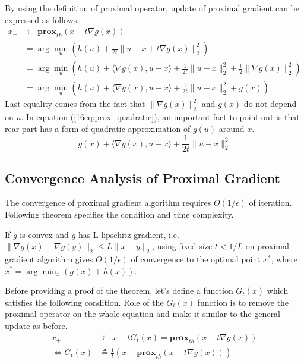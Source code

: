 \documentclass[12pt]{report}
\begin{document}
By using the definition of proximal operator, update of proximal gradient can be expressed as follows:
\begin{align}
x_+ &\leftarrow \textbf{prox}_{th} \left(x - t\nabla g(x) \right)\nonumber\\
&= \arg\min_u \left( h(u)+\frac{1}{2t}\|u-x+t\nabla g(x)\|_2^2 \right)\nonumber\\
&= \arg\min_u \left( h(u)+\langle \nabla g(x), u-x \rangle + \frac{1}{2t}\|u-x\|_2^2 +\frac{t}{2}\| \nabla g(x) \|_2^2 \right)\nonumber\\
&= \arg\min_u \left( h(u)+\langle \nabla g(x), u-x \rangle + \frac{1}{2t}\|u-x\|_2^2 + g(x) \right)
\end{align}\label{16eq:prox_quadratic}
Last equality comes from the fact that $\| \nabla g(x) \|_2^2$ and $g(x)$ do not depend on $u$. In equation (\ref{16eq:prox_quadratic}), an important fact to point out is that rear part has a form of quadratic approximation of $g(u)$ around $x$.
\begin{equation}
g(x) + \langle \nabla g(x), u-x \rangle + \frac{1}{2t}\|u-x\|_2^2 
\end{equation} 

\subsection{Convergence Analysis of Proximal Gradient}
The convergence of proximal gradient algorithm requires $O(1/\epsilon)$ of iteration. Following theorem specifies the condition and time complexity.

\begin{theorem}\label{16thm:convergence}
If $g$ is convex and $g$ has L-lipschitz gradient, i.e. $\| \nabla g(x) - \nabla g(y)\|_2 \leq L\|x-y\|_2$, using fixed size $t < 1/L$ on proximal gradient algorithm gives $O(1/\epsilon)$ of convergence to the optimal point $x^*$, where $x^* = \arg\min_x \left( g(x) + h(x)\right)$.
\end{theorem}

Before providing a proof of the theorem, let's define a function $G_t (x)$ which satisfies the following condition. Role of the $G_t(x)$ function is to remove the proximal operator on the whole equation and make it similar to the general update as before.
\begin{align*}
x_+ &\leftarrow x-t G_t (x)=\textbf{prox}_{th}(x-t\nabla g(x))\\
\Leftrightarrow G_t (x) &\triangleq \frac{1}{t}\left( x - \textbf{prox}_{th}(x-t\nabla g(x)) \right)
\end{align*}
\end{document}
